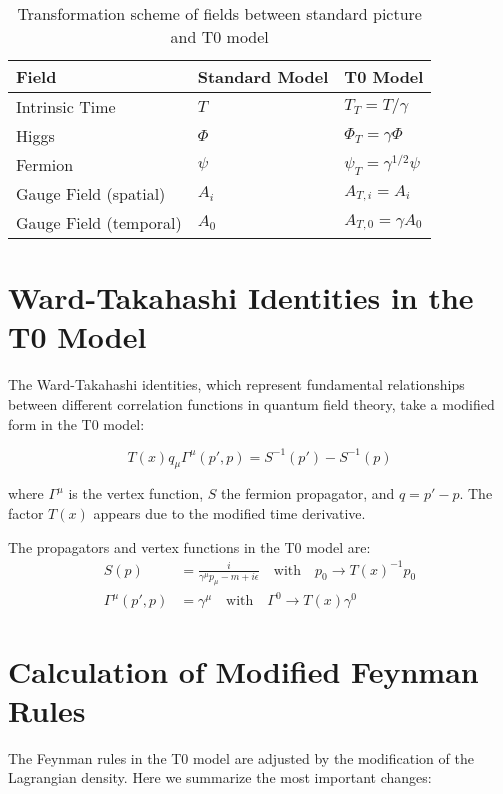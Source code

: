 \documentclass{article}
\theoremstyle{definition}
\theoremstyle{remark}
\newcommand{\Tfield}{T(x)} %
\begin{document}
	\begin{table}[h]
		\centering
		\begin{tabular}{|l|l|l|}
			\hline
			\textbf{Field} & \textbf{Standard Model} & \textbf{T0 Model} \\
			\hline
			Intrinsic Time & $T$ & $T_T = T/\gamma$ \\
			Higgs & $\Phi$ & $\Phi_T = \gamma \Phi$ \\
			Fermion & $\psi$ & $\psi_T = \gamma^{1/2} \psi$ \\
			Gauge Field (spatial) & $A_i$ & $A_{T,i} = A_i$ \\
			Gauge Field (temporal) & $A_0$ & $A_{T,0} = \gamma A_0$ \\
			\hline
		\end{tabular}
		\caption{Transformation scheme of fields between standard picture and T0 model}
	\end{table}
	
	\section{Ward-Takahashi Identities in the T0 Model}
	
	The Ward-Takahashi identities, which represent fundamental relationships between different correlation functions in quantum field theory, take a modified form in the T0 model:
	
	\begin{equation}
		\Tfield q_\mu \Gamma^\mu(p',p) = S^{-1}(p') - S^{-1}(p)
	\end{equation}
	
	where $\Gamma^\mu$ is the vertex function, $S$ the fermion propagator, and $q = p' - p$. The factor $\Tfield$ appears due to the modified time derivative.
	
	The propagators and vertex functions in the T0 model are:
	\begin{align}
		S(p) &= \frac{i}{\gamma^\mu p_\mu - m + i\epsilon} \quad \text{with} \quad p_0 \rightarrow \Tfield^{-1}p_0 \\
		\Gamma^\mu(p',p) &= \gamma^\mu \quad \text{with} \quad \Gamma^0 \rightarrow \Tfield \gamma^0
	\end{align}
	
	\section{Calculation of Modified Feynman Rules}
	
	The Feynman rules in the T0 model are adjusted by the modification of the Lagrangian density. Here we summarize the most important changes:
	
\end{document}
